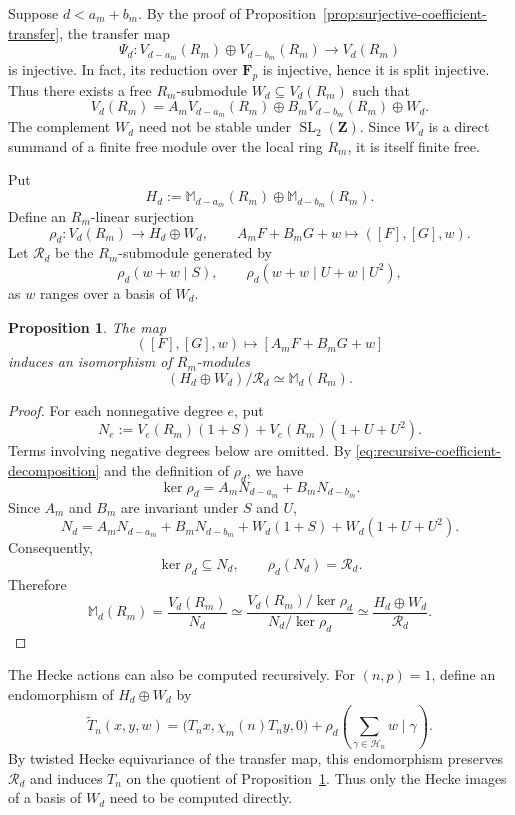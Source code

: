 \documentclass[11pt]{article}
\newcommand{\Z}{\mathbf Z}
\newcommand{\F}{\mathbf F}
\theoremstyle{plain}
\newtheorem{proposition}[theorem]{Proposition}
\theoremstyle{definition}
\theoremstyle{remark}
\numberwithin{equation}{section}
\begin{document}
Suppose $d < a_m + b_m$. By the proof of Proposition~\ref{prop:surjective-coefficient-transfer}, the transfer map \[\Psi_d: V_{d-a_m}(R_m)\oplus V_{d-b_m}(R_m) \longrightarrow V_d(R_m)\] is injective. In fact, its reduction over $\F_p$ is injective, hence it is split injective. Thus there exists a free \(R_m\)-submodule \(W_d\subseteq V_d(R_m)\) such that \begin{equation}\label{eq:recursive-coefficient-decomposition}V_d(R_m) = A_mV_{d-a_m}(R_m) \oplus B_mV_{d-b_m}(R_m) \oplus W_d. \end{equation} The complement \(W_d\) need not be stable under \(\operatorname{SL}_2(\Z)\). Since \(W_d\) is a direct summand of a finite free module over the local ring \(R_m\), it is itself finite free.

Put \[ H_d:= \mathbb M_{d-a_m}(R_m)\oplus \mathbb M_{d-b_m}(R_m). \] Define an \(R_m\)-linear surjection \[ \rho_d:V_d(R_m)\longrightarrow H_d\oplus W_d, \qquad A_mF+B_mG+w\longmapsto([F],[G],w). \] Let \(\mathcal R_d\) be the \(R_m\)-submodule generated by \[ \rho_d(w+w\mid S), \qquad \rho_d(w+w\mid U+w\mid U^2), \] as \(w\) ranges over a basis of \(W_d\).  

\begin{proposition}\label{prop:recursive-manin-presentation} The map \[ ([F],[G],w)\longmapsto[A_mF+B_mG+w] \] induces an isomorphism of \(R_m\)-modules \[ (H_d\oplus W_d)/\mathcal R_d \simeq \mathbb M_d(R_m). \]
\end{proposition}

\begin{proof}
For each nonnegative degree \(e\), put \[ N_e:=V_e(R_m)(1+S)+V_e(R_m)(1+U+U^2). \] Terms involving negative degrees below are omitted. By \eqref{eq:recursive-coefficient-decomposition} and
the definition of \(\rho_d\), we have \[ \ker\rho_d=A_mN_{d-a_m}+B_mN_{d-b_m}. \] Since \(A_m\) and \(B_m\) are invariant under \(S\) and \(U\), \[ N_d= A_mN_{d-a_m}+B_mN_{d-b_m} +W_d(1+S)+W_d(1+U+U^2). \] Consequently, \[ \ker\rho_d\subseteq N_d, \qquad \rho_d(N_d)=\mathcal R_d. \] Therefore \[ \mathbb M_d(R_m) =\frac{V_d(R_m)}{N_d} \simeq \frac{V_d(R_m)/\ker\rho_d}{N_d/\ker\rho_d} \simeq \frac{H_d\oplus W_d}{\mathcal R_d}.\]
\end{proof}

The Hecke actions can also be computed recursively. For \((n,p)=1\), define an endomorphism of \(H_d\oplus W_d\) by \[ \widetilde T_n(x,y,w) = \bigl(T_nx,\chi_m(n)T_ny,0\bigr) + \rho_d\left(\sum_{\gamma\in\mathcal H_n}w\mid\gamma\right). \] By twisted Hecke equivariance of the transfer map, this endomorphism preserves \(\mathcal R_d\) and induces \(T_n\) on the quotient of Proposition~\ref{prop:recursive-manin-presentation}. Thus only the Hecke images of a basis of \(W_d\) need to be computed directly. 
\end{document}
